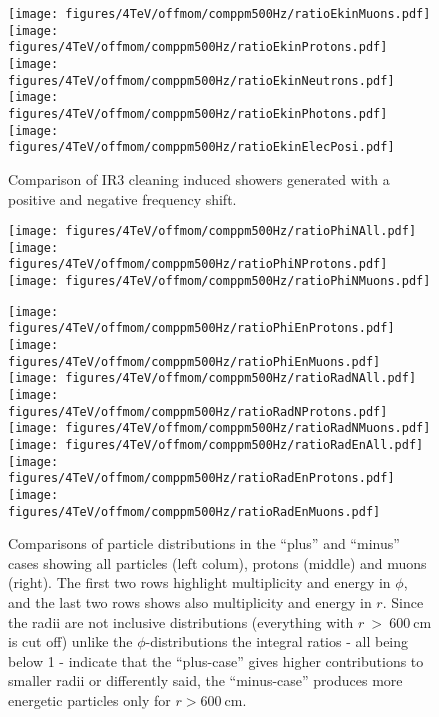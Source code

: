\begin{figure}%
\begin{center}
  \texttt{[image: figures/4TeV/offmom/comppm500Hz/ratioEkinMuons.pdf]}
  \texttt{[image: figures/4TeV/offmom/comppm500Hz/ratioEkinProtons.pdf]}
  \texttt{[image: figures/4TeV/offmom/comppm500Hz/ratioEkinNeutrons.pdf]}
  \texttt{[image: figures/4TeV/offmom/comppm500Hz/ratioEkinPhotons.pdf]}
  \texttt{[image: figures/4TeV/offmom/comppm500Hz/ratioEkinElecPosi.pdf]}
\end{center}
\vspace{-0.6cm}
 \caption{Comparison of IR3 cleaning induced showers generated with a positive and negative frequency shift.
  \label{compPM_ekin}}
\end{figure}

\begin{figure}%
\begin{center}
  \texttt{[image: figures/4TeV/offmom/comppm500Hz/ratioPhiNAll.pdf]}
  \texttt{[image: figures/4TeV/offmom/comppm500Hz/ratioPhiNProtons.pdf]}
  \texttt{[image: figures/4TeV/offmom/comppm500Hz/ratioPhiNMuons.pdf]}

  \texttt{[image: figures/4TeV/offmom/comppm500Hz/ratioPhiEnProtons.pdf]}
  \texttt{[image: figures/4TeV/offmom/comppm500Hz/ratioPhiEnMuons.pdf]}
  \texttt{[image: figures/4TeV/offmom/comppm500Hz/ratioRadNAll.pdf]}
  \texttt{[image: figures/4TeV/offmom/comppm500Hz/ratioRadNProtons.pdf]}
  \texttt{[image: figures/4TeV/offmom/comppm500Hz/ratioRadNMuons.pdf]}
  \texttt{[image: figures/4TeV/offmom/comppm500Hz/ratioRadEnAll.pdf]}
  \texttt{[image: figures/4TeV/offmom/comppm500Hz/ratioRadEnProtons.pdf]}
  \texttt{[image: figures/4TeV/offmom/comppm500Hz/ratioRadEnMuons.pdf]}
\end{center}
\vspace{-0.6cm}
\caption{Comparisons of particle distributions in the ``plus'' and ``minus'' cases showing all particles (left colum), protons (middle) and muons (right). 
The first two rows highlight multiplicity and energy in $\phi$, and the last two rows shows also multiplicity and energy in $r$. Since the radii are not inclusive distributions (everything with $r~>~600~$cm is cut off) unlike the $\phi$-distributions the integral ratios - all being below 1 - indicate that the ``plus-case'' gives higher contributions to smaller radii or differently said, the ``minus-case'' produces more energetic particles only for $r > 600~$cm. 
  \label{compPM_phien}}
\end{figure}
\newpage


